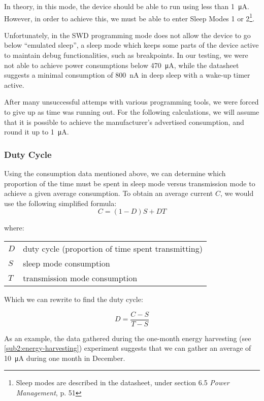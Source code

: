In theory, in this mode, the device should be able to run using less than
\SI{1}{\micro\ampere}. However, in order to achieve this, we must be able to
enter Sleep Modes 1 or 2\footnote{Sleep modes are described in the datasheet,
under section 6.5 \emph{Power Management}, p. 51}.

Unfortunately, in the SWD programming mode does not allow the device to go below
``emulated sleep'', a sleep mode which keeps some parts of the device active to
maintain debug functionalities, such as breakpoints. In our testing, we were not
able to achieve power consumptions below \SI{470}{\micro\ampere}, while the
datasheet suggests a minimal consumption of \SI{800}{nA} in deep sleep with
a wake-up timer active.

After many unsuccessful attemps with various programming tools, we were forced
to give up as time was running out. For the following calculations, we will
assume that it is possible to achieve the manufacturer's advertised consumption,
and round it up to \SI{1}{\micro\ampere}.

\subsubsection{Duty Cycle}\label{sub2:duty-cycle}

Using the consumption data mentioned above, we can determine which proportion of
the time must be spent in sleep mode versus transmission mode to achieve a given
average consumption. To obtain an average current $C$, we would use the
following simplified formula:
\begin{equation*}
  C = (1 - D) S + D T
\end{equation*}

where:

\begin{tabular}[h!]{ll}
$D$   & duty cycle (proportion of time spent transmitting)  \\
$S$   & sleep mode consumption  \\
$T$   & transmission mode consumption \\
\end{tabular}

Which we can rewrite to find the duty cycle:

\begin{equation*}
  D = \frac{C-S}{T-S}
\end{equation*}

As an example, the data gathered during the one-month energy harvesting (see
\autoref{sub2:energy-harvesting}) experiment suggests that we can gather an
average of \SI{10}{\micro\ampere} during one month in December. 

